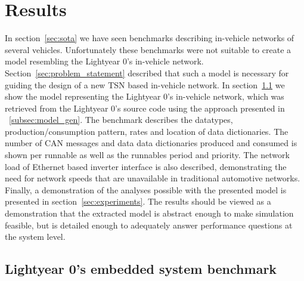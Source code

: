 \section{Results}
\label{sec:results}
In section~\ref{sec:sota} we have seen benchmarks describing in-vehicle networks of several vehicles. Unfortunately these benchmarks were not suitable to create a model resembling the Lightyear 0's in-vehicle network. Section~\ref{sec:problem_statement} described that such a model is necessary for guiding the design of a new TSN based in-vehicle network. In section~\ref{sec:benchmark} we show the model representing the Lightyear 0's in-vehicle network, which was retrieved from the Lightyear 0's source code using the approach presented in ~\ref{subsec:model_gen}. The benchmark describes the datatypes, production/consumption pattern, rates and location of data dictionaries. The number of CAN messages and data data dictionaries produced and consumed is shown per runnable as well as the runnables period and priority. The network load of Ethernet based inverter interface is also described, demonstrating the need for network speeds that are unavailable in traditional automotive networks. Finally, a demonstration of the analyses possible with the presented model is presented in section~\ref{sec:experiments}. The results should be viewed as a demonstration that the extracted model is abstract enough to make simulation feasible, but is detailed enough to adequately answer performance questions at the system level.

\subsection{Lightyear 0's embedded system benchmark}
\label{sec:benchmark}

